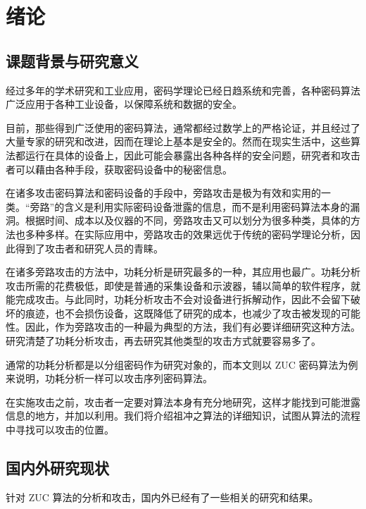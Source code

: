 

\chapter{绪论}

\label{chap:intro}

\section{课题背景与研究意义}

经过多年的学术研究和工业应用，密码学理论已经日趋系统和完善，各种密码算法广泛应用于各种工业设备，以保障系统和数据的安全。

目前，那些得到广泛使用的密码算法，通常都经过数学上的严格论证，并且经过了大量专家的研究和改进，因而在理论上基本是安全的。然而在现实生活中，这些算法都运行在具体的设备上，因此可能会暴露出各种各样的安全问题，研究者和攻击者可以藉由各种手段，获取密码设备中的秘密信息。

在诸多攻击密码算法和密码设备的手段中，旁路攻击是极为有效和实用的一类。“旁路”的含义是利用实际密码设备泄露的信息，而不是利用密码算法本身的漏洞。根据时间、成本以及仪器的不同，旁路攻击又可以划分为很多种类，具体的方法也多种多样。在实际应用中，旁路攻击的效果远优于传统的密码学理论分析，因此得到了攻击者和研究人员的青睐。

在诸多旁路攻击的方法中，功耗分析是研究最多的一种，其应用也最广。功耗分析攻击所需的花费极低，即使是普通的采集设备和示波器，辅以简单的软件程序，就能完成攻击。与此同时，功耗分析攻击不会对设备进行拆解动作，因此不会留下破坏的痕迹，也不会损伤设备，这既降低了研究的成本，也减少了攻击被发现的可能性。因此，作为旁路攻击的一种最为典型的方法，我们有必要详细研究这种方法。研究清楚了功耗分析攻击，再去研究其他类型的攻击方式就要容易多了。

通常的功耗分析都是以分组密码作为研究对象的，而本文则以 ZUC 密码算法为例来说明，功耗分析一样可以攻击序列密码算法。

在实施攻击之前，攻击者一定要对算法本身有充分地研究，这样才能找到可能泄露信息的地方，并加以利用。我们将介绍祖冲之算法的详细知识，试图从算法的流程中寻找可以攻击的位置。

\section{国内外研究现状}

针对 ZUC 算法的分析和攻击，国内外已经有了一些相关的研究和结果。

